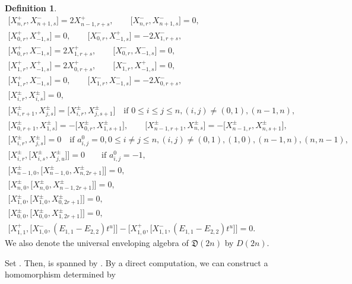 \documentclass[10pt,a4paper]{amsart}
\numberwithin{equation}{section}
\theoremstyle{definition}
\newtheorem{Definition}[Theorem]{Definition}
\begin{document}
\begin{Definition}
\begin{gather}
\bigl[X^+_{n,r},X^-_{n+1,s}\bigr]=2X^+_{n-1,r+s},\qquad \bigl[X^-_{n,r},X^-_{n+1,s}\bigr]=0, \label{5121}\\
\bigl[X^+_{0,r},X^+_{-1,s}\bigr]=0,\qquad \bigl[X^-_{0,r},X^+_{-1,s}\bigr]=-2X^-_{1,r+s}, \label{5122}\\
\bigl[X^+_{0,r},X^-_{-1,s}\bigr]=2X^+_{1,r+s},\qquad \bigl[X^-_{0,r},X^-_{-1,s}\bigr]=0, \label{5123}\\
\bigl[X^+_{1,r},X^+_{-1,s}\bigr]=2X^+_{0,r+s},\qquad \bigl[X^-_{1,r},X^+_{-1,s}\bigr]=0, \label{5124}\\
\bigl[X^+_{1,r},X^-_{-1,s}\bigr]=0,\qquad \bigl[X^-_{1,r},X^-_{-1,s}\bigr]=-2X^-_{0,r+s}, \label{5125}\\
\bigl[X^\pm_{i,r},X^\pm_{i,s}\bigr]=0, \label{5126}\\
\bigl[X^\pm_{i,r+1},X^\pm_{j,s}\bigr]=\bigl[X^\pm_{i,r},X^\pm_{j,s+1}\bigr]\quad \text{if }0\leq i\leq j\leq n,(i,j)\neq(0,1),(n-1,n),\label{5127}\\
\bigl[X^\pm_{0,r+1},X^\pm_{1,s}\bigr]=-\bigl[X^\pm_{0,r},X^\pm_{1,s+1}\bigr],\qquad \bigl[X^\pm_{n-1,r+1},X^\pm_{n,s}\bigr]=-\bigl[X^\pm_{n-1,r},X^\pm_{n,s+1}\bigr], \label{5128}\\
\bigl[X^\pm_{i,r},X^\pm_{j,s}\bigr]=0\quad \text{if }a^0_{i,j}=0,0\leq i\neq j\leq n,(i,j)\neq(0,1),(1,0),(n-1,n),(n,n-1),\!\!\!\label{5129}\\
\bigl[X^\pm_{i,r},\bigl[X^\pm_{i,s},X^\pm_{j,u}\bigr]\bigr]=0\qquad \text{if }a^0_{i,j}=-1,\label{5130}\\
\bigl[X^\pm_{n-1,0},\bigl[X^\pm_{n-1,0},X^\pm_{n,2r+1}\bigr]\bigr]=0,\label{5131}\\
\bigl[X^\pm_{n,0},\bigl[X^\pm_{n,0},X^\pm_{n-1,2r+1}\bigr]\bigr]=0,\label{5132}\\
\bigl[X^\pm_{1,0},\bigl[X^\pm_{1,0},X^\pm_{0,2r+1}\bigr]\bigr]=0,\label{5133}\\
\bigl[X^\pm_{0,0},\bigl[X^\pm_{0,0},X^\pm_{1,2r+1}\bigr]\bigr]=0,\label{5134}\\
\bigl[X^+_{1,1},\bigl[X^-_{1,0},(E_{1,1}-E_{2,2})t^u\bigr]\bigr]-\bigl[X^+_{1,0}, \bigl[X^-_{1,1},(E_{1,1}-E_{2,2})t^u\bigr]\bigr]=0. \label{5135}
\end{gather}
We also denote the universal enveloping algebra of $\mathfrak{D}(2n)$ by $D(2n)$.
\end{Definition}
Set . Then,  is spanned by . By a direct computation, we can construct a homomorphism  determined by
\end{document}
